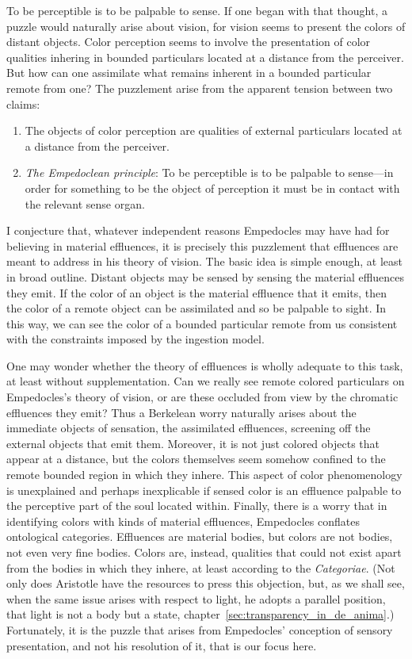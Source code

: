 To be perceptible is to be palpable to sense. If one began with that thought, a puzzle would naturally arise about vision, for vision seems to present the colors of distant objects. Color perception seems to involve the presentation of color qualities inhering in bounded particulars located at a distance from the perceiver. But how can one assimilate what remains inherent in a bounded particular remote from one? The puzzlement arise from the apparent tension between two claims:
\begin{enumerate}[(1)]
    \item The objects of color perception are qualities of external particulars located at a distance from the perceiver.
    \item \emph{The Empedoclean principle}: To be perceptible is to be palpable to sense---in order for something to be the object of perception it must be in contact with the relevant sense organ.
\end{enumerate}
I conjecture that, whatever independent reasons Empedocles may have had for believing in material effluences, it is precisely this puzzlement that effluences are meant to address in his theory of vision. The basic idea is simple enough, at least in broad outline. Distant objects may be sensed by sensing the material effluences they emit. If the color of an object is the material effluence that it emits, then the color of a remote object can be assimilated and so be palpable to sight. In this way, we can see the color of a bounded particular remote from us  consistent with the constraints imposed by the ingestion model. 

One may wonder whether the theory of effluences is wholly adequate to this task, at least without supplementation. Can we really see remote colored particulars on Empedocles's theory of vision, or are these occluded from view by the chromatic effluences they emit? Thus a Berkelean worry naturally arises about the immediate objects of sensation, the assimilated effluences, screening off the external objects that emit them. Moreover, it is not just colored objects that appear at a distance, but the colors themselves seem somehow confined to the remote bounded region in which they inhere. This aspect of color phenomenology is unexplained and perhaps inexplicable if sensed color is an effluence palpable to the perceptive part of the soul located within. Finally, there is a worry that in identifying colors with kinds of material effluences, Empedocles conflates ontological categories. Effluences are material bodies, but colors are not bodies, not even very fine bodies. Colors are, instead, qualities that could not exist apart from the bodies in which they inhere, at least according to the \emph{Categoriae}. (Not only does Aristotle have the resources to press this objection, but, as we shall see, when the same issue arises with respect to light, he adopts a parallel position, that light is not a body but a state, chapter~\ref{sec:transparency_in_de_anima}.) Fortunately, it is the puzzle that arises from Empedocles' conception of sensory presentation, and not his resolution of it, that is our focus here. 

